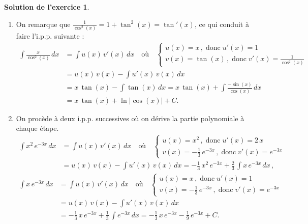 \documentclass[a4paper, 11pt,openany]{article}%
\theoremstyle{plain}
\theoremstyle{definition}
\newtheorem{exo}{Exercice}
\newtheorem{sol}{Solution de l'exercice}
\theoremstyle{remark}
\begin{document}
%
\begin{sol}
\begin{enumerate}
\item On remarque que $ \frac{1}{\cos^2(x)}=1+\tan^2(x)=\tan'(x)$, ce qui conduit à faire l'i.p.p. suivante
:\begin{align*}\int \frac{x} {\cos^2(x)}\, dx &= \int u(x)\, v'(x)\, dx \quad \text{où}\quad \begin{cases}
 u(x)=x\,,\;\text{donc}\; u'(x)=1\\
 v(x)=\tan(x)\,,\;\text{donc}\;v'(x)=\frac{1}{\cos^2(x)}\end{cases}\\
&=u(x)\,v(x)-\int u'(x)\, v(x)\, dx\\
&= x\, \tan(x)-\int \tan(x)\, dx=x\, \tan(x)+\int\frac{-\sin(x)}{\cos(x)}\,dx\\
&=x\, \tan(x)+\ln |\cos(x)|+C.
\end{align*}
\item On procède à deux i.p.p. successives où on dérive la partie polynomiale à chaque
étape.
\begin{align*}
\int x^2\,e^{-3x}\, dx &= \int u(x)\, v'(x)\, dx \quad \text{où}\quad \begin{cases}
 u(x)=x^2\,,\;\text{donc}\; u'(x)=2\,x\\
 v(x)=-\frac{1}{3}\,e^{-3x}\,,\;\text{donc}\;v'(x)=e^{-3x}\end{cases}\\
&=u(x)\,v(x)-\int u'(x)\, v(x)\, dx
= -\frac{1}{3}\,x^2\,e^{-3x}+\frac{2}{3}\,\int x\,e^{-3x}\,dx\,,
\end{align*}
\begin{align*}\int x\,e^{-3x}\, dx &= \int u(x)\, v'(x)\, dx \quad \text{où}\quad \begin{cases}
 u(x)=x\,,\;\text{donc}\; u'(x)=1\\
 v(x)=-\frac{1}{3}\,e^{-3x}\,,\;\text{donc}\;v'(x)=e^{-3x}\end{cases}\\
&=u(x)\,v(x)-\int u'(x)\, v(x)\, dx\\
&= -\frac{1}{3}\,x\,e^{-3x}+\frac{1}{3}\,\int e^{-3x}\,dx
=-\frac{1}{3}\,x\,e^{-3x}-\frac{1}{9}\,e^{-3x}+C.
\end{align*}

\end{enumerate}
\end{sol}
\end{document}
